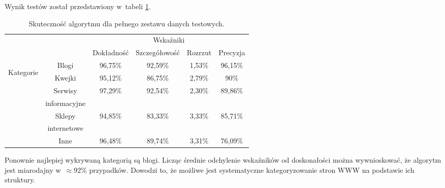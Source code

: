 \documentclass[a4paper,11pt]{article}
\begin{document}
Wynik testów został przedstawiony w~tabeli \ref{tab:full_set_accuracy}.

\begin{table}[ht!]
\centering
    \begin{tabular}{| c | c | c | c | c | c |}
        \hline
        \multicolumn{2}{|c|}{} & \multicolumn{4}{c|}{Wskaźniki} \\
        \cline{3-6}
        \multicolumn{2}{|c|}{} & Dokładność & Szczegółowość & Rozrzut & Precyzja \\
        \hline
        \multirow{7}{*}{\begin{sideways}Kategorie \end{sideways}} & Blogi & 96,75\% & 92,59\% & 1,53\% & 96,15\% \\
        \cline{2-6}
        & Kwejki & 95,12\% & 86,75\% & 2,79\% & 90\% \\
        \cline{2-6}
        & Serwisy & \multirow{2}{*}{97,29\%} & \multirow{2}{*}{92,54\%} & \multirow{2}{*}{2,30\%} & \multirow{2}{*}{89,86\%} \\
        & informacyjne & & & & \\
        \cline{2-6}
        & Sklepy & \multirow{2}{*}{94,85\%} & \multirow{2}{*}{83,33\%} & \multirow{2}{*}{3,33\%} & \multirow{2}{*}{85,71\%} \\
        & internetowe & & & & \\
        \cline{2-6}
        & Inne & 96,48\% & 89,74\% & 3,31\% & 76,09\% \\
        \hline
    \end{tabular}
    \caption{Skuteczność algorytmu dla pełnego zestawu danych testowych.}
    \label{tab:full_set_accuracy}
\end{table}

Ponownie najlepiej wykrywaną kategorią są blogi. Licząc średnie odchylenie wskaźników od doskonałości można wywnioskować, że algorytm jest miarodajny w~$\approx 92\%$ przypadków. Dowodzi to, że możliwe jest systematyczne kategoryzowanie stron WWW na podstawie ich struktury.
\end{document}
